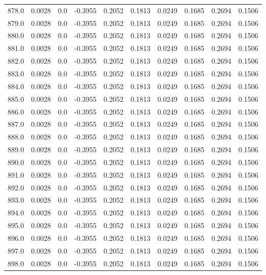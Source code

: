 \begin{longtable}{lrrrrrrrrr}
878.0 & 0.0028 & 0.0 & -0.3955 & 0.2052 & 0.1813 & 0.0249 & 0.1685 & 0.2694 & 0.1506 \\
879.0 & 0.0028 & 0.0 & -0.3955 & 0.2052 & 0.1813 & 0.0249 & 0.1685 & 0.2694 & 0.1506 \\
880.0 & 0.0028 & 0.0 & -0.3955 & 0.2052 & 0.1813 & 0.0249 & 0.1685 & 0.2694 & 0.1506 \\
881.0 & 0.0028 & 0.0 & -0.3955 & 0.2052 & 0.1813 & 0.0249 & 0.1685 & 0.2694 & 0.1506 \\
882.0 & 0.0028 & 0.0 & -0.3955 & 0.2052 & 0.1813 & 0.0249 & 0.1685 & 0.2694 & 0.1506 \\
883.0 & 0.0028 & 0.0 & -0.3955 & 0.2052 & 0.1813 & 0.0249 & 0.1685 & 0.2694 & 0.1506 \\
884.0 & 0.0028 & 0.0 & -0.3955 & 0.2052 & 0.1813 & 0.0249 & 0.1685 & 0.2694 & 0.1506 \\
885.0 & 0.0028 & 0.0 & -0.3955 & 0.2052 & 0.1813 & 0.0249 & 0.1685 & 0.2694 & 0.1506 \\
886.0 & 0.0028 & 0.0 & -0.3955 & 0.2052 & 0.1813 & 0.0249 & 0.1685 & 0.2694 & 0.1506 \\
887.0 & 0.0028 & 0.0 & -0.3955 & 0.2052 & 0.1813 & 0.0249 & 0.1685 & 0.2694 & 0.1506 \\
888.0 & 0.0028 & 0.0 & -0.3955 & 0.2052 & 0.1813 & 0.0249 & 0.1685 & 0.2694 & 0.1506 \\
889.0 & 0.0028 & 0.0 & -0.3955 & 0.2052 & 0.1813 & 0.0249 & 0.1685 & 0.2694 & 0.1506 \\
890.0 & 0.0028 & 0.0 & -0.3955 & 0.2052 & 0.1813 & 0.0249 & 0.1685 & 0.2694 & 0.1506 \\
891.0 & 0.0028 & 0.0 & -0.3955 & 0.2052 & 0.1813 & 0.0249 & 0.1685 & 0.2694 & 0.1506 \\
892.0 & 0.0028 & 0.0 & -0.3955 & 0.2052 & 0.1813 & 0.0249 & 0.1685 & 0.2694 & 0.1506 \\
893.0 & 0.0028 & 0.0 & -0.3955 & 0.2052 & 0.1813 & 0.0249 & 0.1685 & 0.2694 & 0.1506 \\
894.0 & 0.0028 & 0.0 & -0.3955 & 0.2052 & 0.1813 & 0.0249 & 0.1685 & 0.2694 & 0.1506 \\
895.0 & 0.0028 & 0.0 & -0.3955 & 0.2052 & 0.1813 & 0.0249 & 0.1685 & 0.2694 & 0.1506 \\
896.0 & 0.0028 & 0.0 & -0.3955 & 0.2052 & 0.1813 & 0.0249 & 0.1685 & 0.2694 & 0.1506 \\
897.0 & 0.0028 & 0.0 & -0.3955 & 0.2052 & 0.1813 & 0.0249 & 0.1685 & 0.2694 & 0.1506 \\
898.0 & 0.0028 & 0.0 & -0.3955 & 0.2052 & 0.1813 & 0.0249 & 0.1685 & 0.2694 & 0.1506 \\

\end{longtable}

